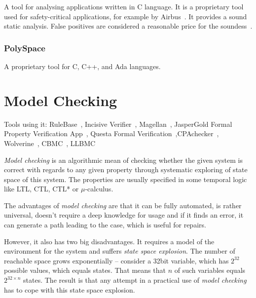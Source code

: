 A tool for analysing applications written in C language. It is a proprietary tool used for safety-critical applications, for example by Airbus~\cite{KrenaVojnarOverview}. It provides a sound static analysis. False positives are considered a reasonable price for the soundess~\cite{Astree1}.

\subsubsection{PolySpace}

A proprietary tool for C, C++, and Ada languages.

\section{Model Checking}\label{chap:fav:modelChecking}
Tools using it: RuleBase~\cite{KrenaVojnarOverview}, Incisive Verifier~\cite{KrenaVojnarOverview}, Magellan~\cite{KrenaVojnarOverview}, JasperGold Formal Property Verification App~\cite{KrenaVojnarOverview}, Questa Formal Verification~\cite{KrenaVojnarOverview},CPAchecker~\cite{KrenaVojnarOverview}, Wolverine~\cite{KrenaVojnarOverview}, CBMC~\cite{KrenaVojnarOverview}, LLBMC~\cite{KrenaVojnarOverview}

{\em Model checking} is an algorithmic mean of checking whether the given system is correct with regards to any given property through systematic exploring of state space of this system. The properties are usually specified in some temporal logic like LTL, CTL, CTL* or $\mu$-calculus.

The advantages of {\em model checking} are that it can be fully automated, is rather universal, doesn't require a deep knowledge for usage and if it finds an error, it can generate a path leading to the case, which is useful for repairs.

However, it also has two big disadvantages. It requires a model of the environment for the system and suffers {\em state space explosion}. The number of reachable space grows exponentially -- consider a 32bit variable, which has $2^{32}$ possible values, which equals states. That means that $n$ of such variables equals $2^{32\times n}$ states. The result is that any attempt in a practical use of {\em model checking} has to cope with this state space explosion.

